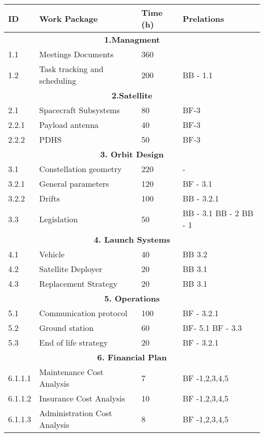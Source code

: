 \begin{longtable}{ | p{1.3cm} | p{7cm} | p{3cm} | p{3.5cm} |}
\hline

\textbf{ID }& \textbf{Work Package} & \textbf{Time (h)} & \textbf{Prelations} \\ \hline
\multicolumn{4}{|c|}{\textbf{1.Managment}} \\ \hline
1.1 & Meetings Documents & 360 &   \\ \hline
1.2 & Task tracking and scheduling & 200 & BB - 1.1 \\ \hline
\multicolumn{4}{|c|}{\textbf{2.Satellite}} \\ \hline
2.1 & Spacecraft Subsystems & 80 & BF-3 \\ \hline
2.2.1 & Payload antenna & 40 & BF-3 \\ \hline
2.2.2 & PDHS & 50 & BF-3 \\ \hline
\multicolumn{4}{|c|}{\textbf{3. Orbit Design}} \\ \hline
3.1 & Constellation geometry & 220 & - \\ \hline
3.2.1 & General parameters & 120 & BF - 3.1 \\ \hline
3.2.2 & Drifts & 100 & BB - 3.2.1 \\ \hline
3.3 & Legislation & 50 & BB - 3.1 \newline
BB - 2 \newline 
BB - 1 \\ \hline
\multicolumn{4}{|c|}{\textbf{4. Launch Systems}} \\ \hline
4.1 & Vehicle & 40 & BB 3.2 \\ \hline
4.2 & Satellite Deployer & 20 & BB 3.1  \\ \hline
4.3 & Replacement Strategy & 20 & BB 3.1  \\ \hline
\multicolumn{4}{|c|}{\textbf{5. Operations}} \\ \hline
5.1 & Communication protocol & 100 & BF - 3.2.1 \\ \hline
5.2 & Ground station & 60 & BF- 5.1 \newline BF - 3.3 \\ \hline
5.3 & End of life strategy & 20 & BF - 3.2.1 \\
\hline
\multicolumn{4}{|c|}{\textbf{6. Financial Plan}} \\ \hline
6.1.1.1 & Maintenance Cost Analysis & 7 & BF -1,2,3,4,5 \\ \hline
6.1.1.2 & Insurance Cost Analysis & 10 & BF -1,2,3,4,5  \\ \hline
6.1.1.3 & Administration Cost Analysis & 8 & BF -1,2,3,4,5 \\ \hline

\end{longtable}
